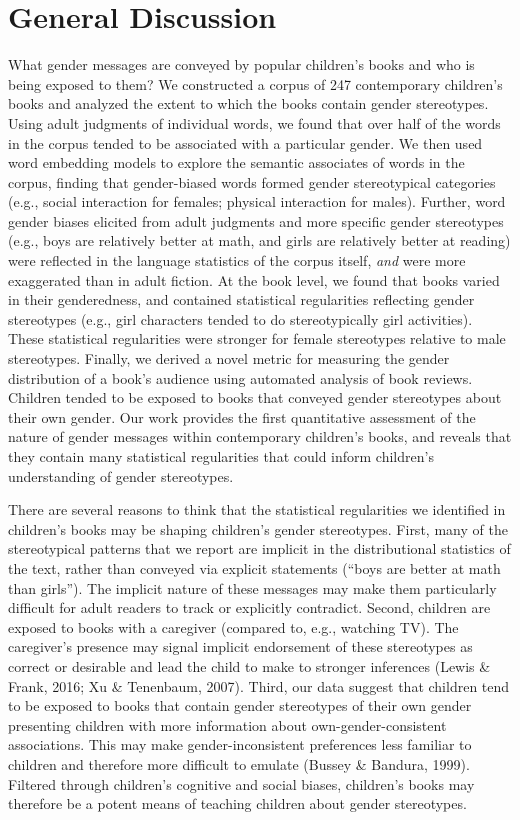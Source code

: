 \documentclass[
  english,
  ,man,floatsintext]{apa6}
\begin{document}
\hypertarget{general-discussion}{%
\section{General Discussion}\label{general-discussion}}

What gender messages are conveyed by popular children's books and who is being exposed to them? We constructed a corpus of 247 contemporary children's books and analyzed the extent to which the books contain gender stereotypes. Using adult judgments of individual words, we found that over half of the words in the corpus tended to be associated with a particular gender. We then used word embedding models to explore the semantic associates of words in the corpus, finding that gender-biased words formed gender stereotypical categories (e.g., social interaction for females; physical interaction for males). Further, word gender biases elicited from adult judgments and more specific gender stereotypes (e.g., boys are relatively better at math, and girls are relatively better at reading) were reflected in the language statistics of the corpus itself, \emph{and} were more exaggerated than in adult fiction. At the book level, we found that books varied in their genderedness, and contained statistical regularities reflecting gender stereotypes (e.g., girl characters tended to do stereotypically girl activities). These statistical regularities were stronger for female stereotypes relative to male stereotypes. Finally, we derived a novel metric for measuring the gender distribution of a book's audience using automated analysis of book reviews. Children tended to be exposed to books that conveyed gender stereotypes about their own gender. Our work provides the first quantitative assessment of the nature of gender messages within contemporary children's books, and reveals that they contain many statistical regularities that could inform children's understanding of gender stereotypes.

There are several reasons to think that the statistical regularities we identified in children's books may be shaping children's gender stereotypes. First, many of the stereotypical patterns that we report are implicit in the distributional statistics of the text, rather than conveyed via explicit statements (\enquote{boys are better at math than girls}). The implicit nature of these messages may make them particularly difficult for adult readers to track or explicitly contradict. Second, children are exposed to books with a caregiver (compared to, e.g., watching TV). The caregiver's presence may signal implicit endorsement of these stereotypes as correct or desirable and lead the child to make to stronger inferences (Lewis \& Frank, 2016; Xu \& Tenenbaum, 2007). Third, our data suggest that children tend to be exposed to books that contain gender stereotypes of their own gender presenting children with more information about own-gender-consistent associations. This may make gender-inconsistent preferences less familiar to children and therefore more difficult to emulate (Bussey \& Bandura, 1999). Filtered through children's cognitive and social biases, children's books may therefore be a potent means of teaching children about gender stereotypes.
\end{document}
